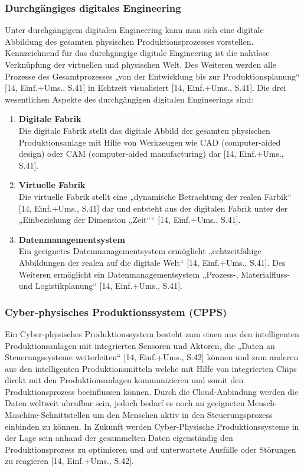 \subsubsection{Durchgängiges digitales Engineering}\label{sec:DigitalesEngineering}
Unter durchgängigem digitalen Engineering kann man sich eine digitale Abbildung des gesamten physischen Produktionsprozesses vorstellen. Kennzeichnend für das durchgängige digitale Engineering ist die nahtlose Verknüpfung der virtuellen und physischen Welt. Des Weiteren werden alle Prozesse des Gesamtprozesses „von der Entwicklung bis zur Produktionsplanung“ [14, Einf.+Ums., S.41] in Echtzeit visualisiert [14, Einf.+Ums., S.41].
\newline\newline
Die drei wesentlichen Aspekte des durchgängigen digitalen Engineerings sind:
\begin{enumerate}
	\item \textbf{Digitale Fabrik} \\ 
	Die digitale Fabrik stellt das digitale Abbild der gesamten physischen Produktionsanlage mit Hilfe von Werkzeugen wie CAD (computer-aided design) oder CAM (computer-aided manufacturing) dar [14, Einf.+Ums., S.41].
	\item \textbf{Virtuelle Fabrik} \\
	Die virtuelle Fabrik stellt eine „dynamische Betrachtung der realen Farbik“ [14, Einf.+Ums., S.41] dar und entsteht aus der digitalen Fabrik unter der „Einbeziehung der Dimension „Zeit““ [14, Einf.+Ums., S.41].
	\item \textbf{Datenmanagementsystem} \\
	Ein geeignetes Datenmanagementsystem ermöglicht „echtzeitfähige Abbildungen der realen auf die digitale Welt“ [14, Einf.+Ums., S.41]. Des Weiteren ermöglicht ein Datenmanagementsystem „Prozess-, Materialfluss- und Logistikplanung“ [14, Einf.+Ums., S.41].
\end{enumerate}

\subsubsection{Cyber-physisches Produktionssystem (CPPS)}\label{sec:CPPS}
Ein Cyber-physisches Produktionssystem besteht zum einen aus den intelligenten Produktionsanlagen mit integrierten Sensoren und Aktoren, die „Daten an Steuerungssysteme weiterleiten“ [14, Einf.+Ums., S.42] können und zum anderen aus den intelligenten Produktionsmitteln welche mit Hilfe von integrierten Chips direkt mit den Produktionsanlagen kommunizieren und somit den Produktionsprozess beeinflussen können. \newline
Durch die Cloud-Anbindung werden die Daten weltweit abrufbar sein, jedoch bedarf es noch an geeigneten Mensch-Maschine-Schnittstellen um den Menschen aktiv in den Steuerungsprozess einbinden zu können. 
\newline
In Zukunft werden Cyber-Physische Produktionssysteme in der Lage sein anhand der gesammelten Daten eigenständig den Produktionsprozess zu optimieren und auf unterwartete Ausfälle oder Störungen zu reagieren [14, Einf.+Ums., S.42].

